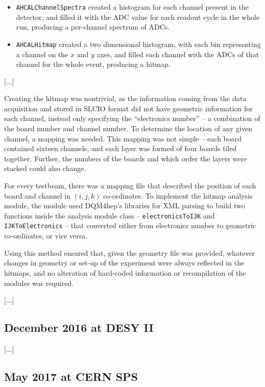 \begin{itemize}
	\item \texttt{AHCALChannelSpectra} created a histogram for each channel present in the detector, and filled it with the ADC value for each readout cycle in the whole run, producing a per-channel spectrum of ADCs.
	\item \texttt{AHCALHitmap} created a two dimensional histogram, with each bin representing a channel on the $x$ and $y$ axes, and filled each channel with the ADCs of that channel for the whole event, producing a hitmap. 
\end{itemize}

[...]

Creating the hitmap was nontrivial, as the information coming from the data acquisition and stored in SLCIO format did not have geometric information for each channel, instead only specifying the ``electronics number'' -- a combination of the board number and channel number. To determine the location of any given channel, a mapping was needed. This mapping was not simple -- each board contained sixteen channels, and each layer was formed of four boards tiled together. Further, the numbers of the boards and which order the layers were stacked could also change.

For every testbeam, there was a mapping file that described the position of each board and channel in $(i, j, k)$ co-ordinates. To implement the hitmap analysis module, the module used DQM4hep's libraries for XML parsing to build two functions inside the analysis module class --  \texttt{electronicsToIJK} and \texttt{IJKToElectronics} -- that converted either from electronics number to geometric co-ordinates, or vice versa.

Using this method ensured that, given the geometry file was provided, whatever changes in geometry or set-up of the experiment were always reflected in the hitmaps, and no alteration of hard-coded information or recompilation of the modules was required.

[...]

\subsection{December 2016 at DESY II}
[...]

\subsection{May 2017 at CERN SPS}

